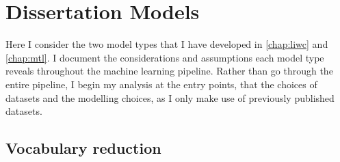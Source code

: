 \section{Dissertation Models}

Here I consider the two model types that I have developed in \autoref{chap:liwc} and \autoref{chap:mtl}. I document the considerations and assumptions each model type reveals throughout the machine learning pipeline. Rather than go through the entire pipeline, I begin my analysis at the entry points, that the choices of datasets and the modelling choices, as I only make use of previously published datasets.

\subsection{Vocabulary reduction}\label{sub:vocab_redux}

